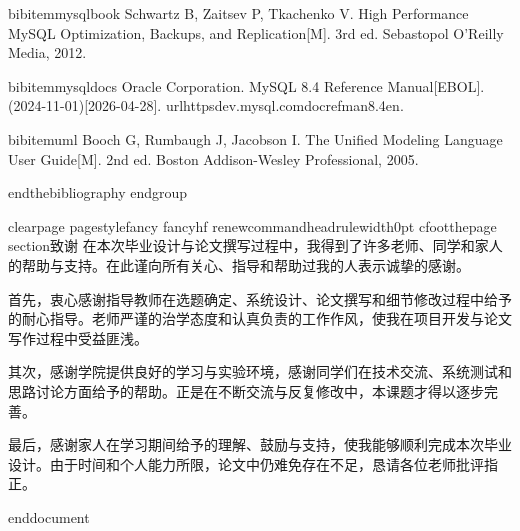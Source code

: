 bibitem{mysqlbook}
Schwartz B, Zaitsev P, Tkachenko V. High Performance MySQL Optimization, Backups, and Replication[M]. 3rd ed. Sebastopol O'Reilly Media, 2012.

bibitem{mysqldocs}
Oracle Corporation. MySQL 8.4 Reference Manual[EBOL]. (2024-11-01)[2026-04-28]. url{httpsdev.mysql.comdocrefman8.4en}.

bibitem{uml}
Booch G, Rumbaugh J, Jacobson I. The Unified Modeling Language User Guide[M]. 2nd ed. Boston Addison-Wesley Professional, 2005.

end{thebibliography}
endgroup

clearpage
pagestyle{fancy}
fancyhf{}
renewcommand{headrulewidth}{0pt}
cfoot{thepage}
section{致谢}
在本次毕业设计与论文撰写过程中，我得到了许多老师、同学和家人的帮助与支持。在此谨向所有关心、指导和帮助过我的人表示诚挚的感谢。

首先，衷心感谢指导教师在选题确定、系统设计、论文撰写和细节修改过程中给予的耐心指导。老师严谨的治学态度和认真负责的工作作风，使我在项目开发与论文写作过程中受益匪浅。

其次，感谢学院提供良好的学习与实验环境，感谢同学们在技术交流、系统测试和思路讨论方面给予的帮助。正是在不断交流与反复修改中，本课题才得以逐步完善。

最后，感谢家人在学习期间给予的理解、鼓励与支持，使我能够顺利完成本次毕业设计。由于时间和个人能力所限，论文中仍难免存在不足，恳请各位老师批评指正。

end{document}
